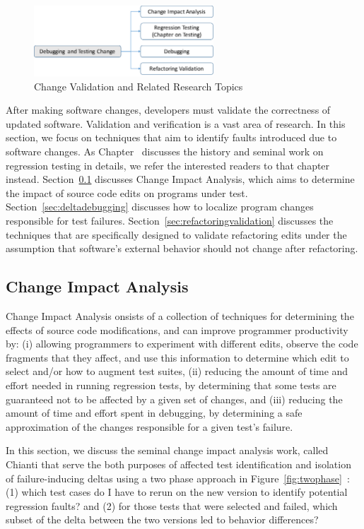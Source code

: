 \begin{figure}[ht]
 \centering
 \includegraphics[width=0.6\textwidth]{images/ChangeValidation.pdf} 
 \caption{Change Validation and Related Research Topics} 
 \label{fig:changevalidation} 
\end{figure}

After making software changes, developers must validate the correctness of updated software. Validation and verification is a vast area of research. In this section, we focus on techniques that aim to identify faults introduced due to software changes. As Chapter~ discusses the history and seminal work on regression testing in details, we refer the interested readers to that chapter instead. Section~\ref{sec:CIA} discusses Change Impact Analysis, which aims to determine the impact of source code edits on programs under test. Section~\ref{sec:deltadebugging} discusses how to localize program changes responsible for test failures. Section~\ref{sec:refactoringvalidation} discusses the techniques that are specifically designed to validate refactoring edits under the assumption that software's external behavior should not change after refactoring. 

\subsection{Change Impact Analysis} 
\label{sec:CIA} 
Change Impact Analysis onsists of a collection of techniques for determining the effects of source code modifications, and can improve programmer productivity by: (i) allowing programmers to experiment with different edits, observe the code fragments that they affect, and use this information to determine which edit to select and/or how to augment test suites, (ii) reducing the amount of time and effort needed in running regression tests, by determining that some tests are guaranteed not to be affected by a given set of changes, and (iii) reducing the amount of time and effort spent in debugging, by determining a safe approximation of the changes responsible for a given test’s failure. 

In this section, we discuss the seminal change impact analysis work, called Chianti that serve the both purposes of affected test identification and isolation of failure-inducing deltas using a two phase approach in Figure~\ref{fig:twophase}~\cite{Ren2004}: (1) which test cases do I have to rerun on the new version to identify potential regression faults? and (2) for those tests that were selected and failed, which subset of the delta between the two versions led to behavior differences?  

